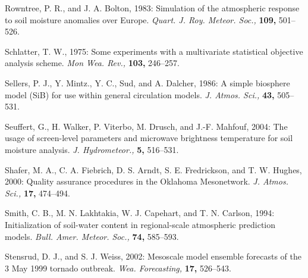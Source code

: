 \documentclass[twocolumn]{article}
\begin{document}
\begin{references}
{\item Rowntree, P. R., and J. A. Bolton, 1983: Simulation of the atmospheric response to soil moisture anomalies over Europe. \textit{Quart. J. Roy. Meteor. Soc.,} \textbf{109,} 501--526.

\vspace{0.235mm}

\item Schlatter, T. W., 1975: Some experiments with a multivariate statistical objective analysis scheme. \textit{Mon Wea. Rev.,} \textbf{103,} 246--257.

\vspace{0.235mm}

\item Sellers, P. J., Y. Mintz., Y. C., Sud, and A. Dalcher, 1986: A simple biosphere model (SiB) for use within general circulation models. \textit{J. Atmos. Sci.,} \textbf{43,} 505--531. 

\vspace{0.235mm}

\item Seuffert, G., H. Walker, P. Viterbo, M. Drusch, and J.-F. Mahfouf, 2004: The usage of screen-level parameters and microwave brightness temperature for soil moisture analysis. \textit{J. Hydrometeor.,} \textbf{5,} 516--531.

\vspace{0.235mm}

\item Shafer, M. A., C. A. Fiebrich, D. S. Arndt, S. E. Fredrickson, and T. W. Hughes, 2000: Quality assurance procedures in the Oklahoma Mesonetwork. \textit{J. Atmos. Sci.,} \textbf{17,} 474--494.

\vspace{0.235mm}

\item Smith, C. B., M. N. Lakhtakia, W. J. Capehart, and T. N. Carlson, 1994: Initialization of soil-water content in regional-scale atmospheric prediction models. \textit{Bull. Amer. Meteor. Soc.,} \textbf{74,} 585--593.

\vspace{0.235mm}

\item Stensrud, D. J., and S. J. Weiss, 2002: Mesoscale model ensemble forecasts of the 3 May 1999 tornado outbreak. \textit{Wea. Forecasting,} \textbf{17,} 526--543.

\vspace{0.235mm}

}
\end{references}
\end{document}

